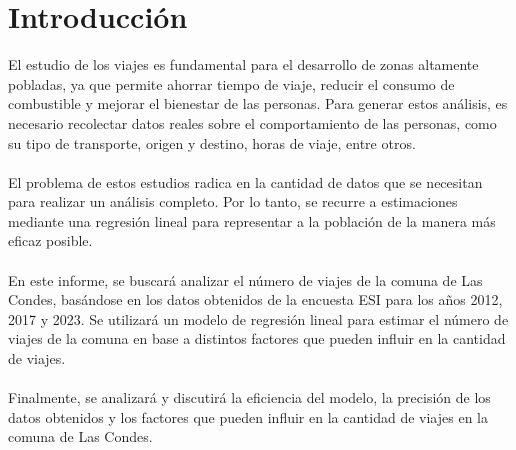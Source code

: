 \documentclass[12pt]{article} %
\begin{document}

\setcounter{page}{1} %

\section{Introducción}

El estudio de los viajes es fundamental para el desarrollo de zonas altamente pobladas, ya que permite ahorrar tiempo de viaje, reducir el consumo de combustible y mejorar el bienestar de las personas. Para generar estos análisis, es necesario recolectar datos reales sobre el comportamiento de las personas, como su tipo de transporte, origen y destino, horas de viaje, entre otros.
\\ \\
El problema de estos estudios radica en la cantidad de datos que se necesitan para realizar un análisis completo. Por lo tanto, se recurre a estimaciones mediante una regresión lineal para representar a la población de la manera más eficaz posible.
\\ \\
En este informe, se buscará analizar el número de viajes de la comuna de Las Condes, basándose en los datos obtenidos de la encuesta ESI para los años 2012, 2017 y 2023. Se utilizará un modelo de regresión lineal para estimar el número de viajes de la comuna en base a distintos factores que pueden influir en la cantidad de viajes.
\\ \\
Finalmente, se analizará y discutirá la eficiencia del modelo, la precisión de los datos obtenidos y los factores que pueden influir en la cantidad de viajes en la comuna de Las Condes.
\end{document}
